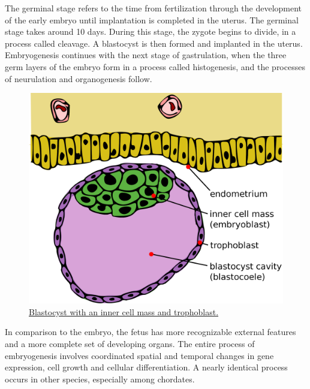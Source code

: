 The germinal stage refers to the time from fertilization through the development of the early embryo until implantation is completed in the uterus. The germinal stage takes around 10 days. During this stage, the zygote begins to divide, in a process called cleavage. A blastocyst is then formed and implanted in the uterus. Embryogenesis continues with the next stage of gastrulation, when the three germ layers of the embryo form in a process called histogenesis, and the processes of neurulation and organogenesis follow.



\begin{figure}

{\centering \includegraphics[width=0.7\linewidth]{./figures/development/Blastocyst_English} 

}

\caption{\href{https://commons.wikimedia.org/wiki/File:Blastocyst_English.svg}{Blastocyst with an inner cell mass and trophoblast.}}\label{fig:blastocyst}
\end{figure}

In comparison to the embryo, the fetus has more recognizable external features and a more complete set of developing organs. The entire process of embryogenesis involves coordinated spatial and temporal changes in gene expression, cell growth and cellular differentiation. A nearly identical process occurs in other species, especially among chordates.



